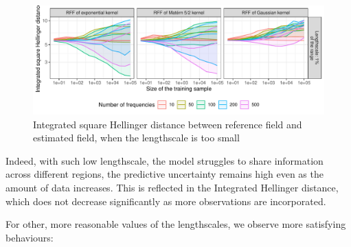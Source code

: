 \documentclass[
]{article}
\begin{document}
\begin{figure}[H]

{\centering \includegraphics{IntroductionSLGP_files/figure-latex/PlotTooSmallLen-1} 

}

\caption{Integrated square Hellinger distance between reference field and estimated field, when the lengthscale is too small}\label{fig:PlotTooSmallLen}
\end{figure}

Indeed, with such low lengthscale, the model struggles to share information across different regions, the predictive uncertainty remains high even as the amount of data increases. This is reflected in the Integrated Hellinger distance, which does not decrease significantly as more observations are incorporated.

For other, more reasonable values of the lengthscales, we observe more satisfying behaviours:
\end{document}
